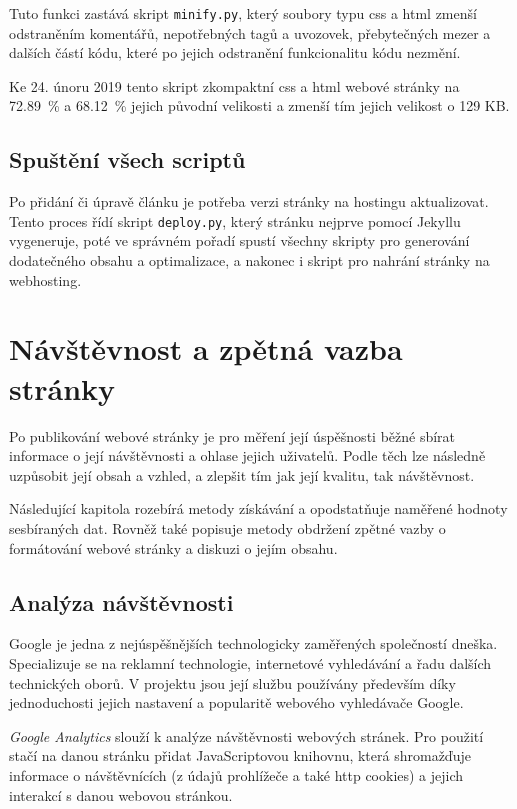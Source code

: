\documentclass[a4paper, 12pt, twoside]{article}
\begin{document}
  Tuto funkci zastává skript \texttt{minify.py}, který soubory typu \gls{css} a \gls{html} zmenší odstraněním komentářů, nepotřebných tagů a uvozovek, přebytečných mezer a dalších částí kódu, které po jejich odstranění funkcionalitu kódu nezmění.

  Ke 24. únoru 2019 tento skript zkompaktní \gls{css} a \gls{html} webové stránky na \SI{72.89}{\percent} a \SI{68.12}{\percent} jejich původní velikosti a zmenší tím jejich velikost o \num{129} KB.


  \subsection{Spuštění všech scriptů}
  Po přidání či úpravě článku je potřeba verzi stránky na hostingu aktualizovat. Tento proces řídí skript \texttt{deploy.py}, který stránku nejprve pomocí Jekyllu vygeneruje, poté ve správném pořadí spustí všechny skripty pro generování dodatečného obsahu a optimalizace, a nakonec i skript pro nahrání stránky na webhosting.


  \section{Návštěvnost a zpětná vazba stránky}
  Po publikování webové stránky je pro měření její úspěšnosti běžné sbírat informace o její návštěvnosti a ohlase jejich uživatelů. Podle těch lze následně uzpůsobit její obsah a vzhled, a zlepšit tím jak její kvalitu, tak návštěvnost.

  Následující kapitola rozebírá metody získávání a opodstatňuje naměřené hodnoty sesbíraných dat. Rovněž také popisuje metody obdržení zpětné vazby o formátování webové stránky a diskuzi o jejím obsahu.


  \subsection{Analýza návštěvnosti}
  Google je jedna z nejúspěšnějších technologicky zaměřených společností dneška. Specializuje se na reklamní technologie, internetové vyhledávání a řadu dalších technických oborů. V projektu jsou její službu používány především díky jednoduchosti jejich nastavení a popularitě webového vyhledávače Google.

  \emph{Google Analytics} slouží k analýze návštěvnosti webových stránek. Pro použití stačí na danou stránku přidat JavaScriptovou knihovnu, která shromažďuje informace o návštěvnících (z údajů prohlížeče a také \gls{http} cookies) a jejich interakcí s danou webovou stránkou.
\end{document}
